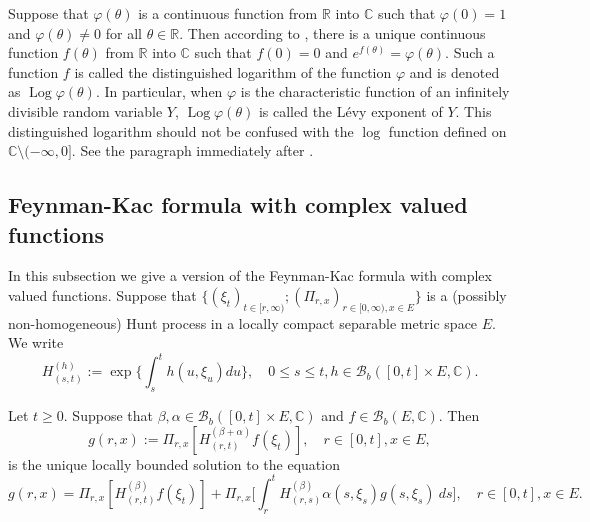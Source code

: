     Suppose that $\varphi(\theta)$ is a continuous function from $\mathbb R$ into $\mathbb C$ such that $\varphi(0) = 1$ and $\varphi(\theta) \neq 0$ for all $\theta \in \mathbb R$.
    Then according to \cite[Lemma 7.6]{Sato2013Levy}, there is a unique continuous function $f(\theta)$ from $\mathbb R$ into $\mathbb C$ such that $f(0) = 0$ and $e^{f(\theta)} = \varphi(\theta)$.
    Such a function $f$ is called the distinguished logarithm of the function $\varphi$ and is denoted as $\operatorname{Log} \varphi(\theta)$.
    In particular, when $\varphi$ is the characteristic function of an infinitely divisible random variable $Y$,  $\operatorname{Log} \varphi(\theta)$ is called the L\'evy exponent of $Y$.
    This distinguished logarithm should not be confused with the $\log$ function defined on $\mathbb C\setminus (-\infty, 0]$.
    See the paragraph immediately after \cite[Lemma 7.6]{Sato2013Levy}.

\subsection{Feynman-Kac formula with complex valued functions}
\label{seq: complex Feynman-Kac transform}
    In this subsection we give a version of the Feynman-Kac formula with complex valued functions.
    Suppose that $\{(\xi_t)_{t \in [r,\infty)}; (\Pi_{r,x})_{r\in [0,\infty), x\in E}\}$ is a (possibly non-homogeneous) Hunt process in a locally compact separable metric space $E$.
    We write
\begin{equation}
    H^{(h)}_{(s,t)}
    := \exp\Big\{\int_s^t h(u,\xi_u) du\Big\},
    \quad 0 \leq s \leq t, h \in \mathcal B_b([0,t] \times E,\mathbb C).
\end{equation}

\begin{lem}
\label{eq: complex FK}
    Let $t \geq 0$. Suppose that
    $\beta, \alpha\in \mathcal B_b([0,t] \times E, \mathbb C)$
    and $f\in \mathcal B_b(E, \mathbb C)$.
    Then
\begin{equation}
\label{eq: expresion of g}
    g(r,x) := \Pi_{r,x}[ H_{(r,t)}^{(\beta+\alpha)} f(\xi_t)],\quad r \in [0,t], x\in E,
\end{equation}
    is the unique locally bounded solution to the equation
\[
    g(r,x)= \Pi_{r,x} [ H_{(r,t)}^{(\beta)} f(\xi_t)]+\Pi_{r,x} \Big[ \int_r^tH_{(r,s)}^{(\beta)}\alpha(s,\xi_s) g(s,\xi_s)~ds \Big],\quad r \in [0,t], x\in E.
\]
\end{lem}


